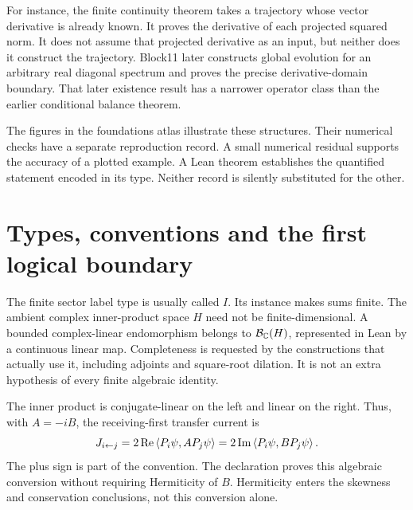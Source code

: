 For instance, the finite continuity theorem takes a trajectory whose vector derivative is already known. It proves the derivative of each projected squared norm. It does not assume that projected derivative as an input, but neither does it construct the trajectory. Block11 later constructs global evolution for an arbitrary real diagonal spectrum and proves the precise derivative-domain boundary. That later existence result has a narrower operator class than the earlier conditional balance theorem.

The figures in the foundations atlas illustrate these structures. Their numerical checks have a separate reproduction record. A small numerical residual supports the accuracy of a plotted example. A Lean theorem establishes the quantified statement encoded in its type. Neither record is silently substituted for the other.

\section{Types, conventions and the first logical boundary}

The finite sector label type is usually called \(I\). Its  instance makes sums finite. The ambient complex inner-product space \(H\) need not be finite-dimensional. A bounded complex-linear endomorphism belongs to \(\mathcal B_{\mathbb C}(H)\), represented in Lean by a continuous linear map. Completeness is requested by the constructions that actually use it, including adjoints and square-root dilation. It is not an extra hypothesis of every finite algebraic identity.

The inner product is conjugate-linear on the left and linear on the right. Thus, with \(A=-iB\), the receiving-first transfer current is
\[
 J_{i\leftarrow j}=2\operatorname{Re}\left\langle P_i\psi,A P_j\psi\right\rangle
 =2\operatorname{Im}\left\langle P_i\psi,B P_j\psi\right\rangle.
\]
The plus sign is part of the convention. The declaration  proves this algebraic conversion without requiring Hermiticity of \(B\). Hermiticity enters the skewness and conservation conclusions, not this conversion alone.

